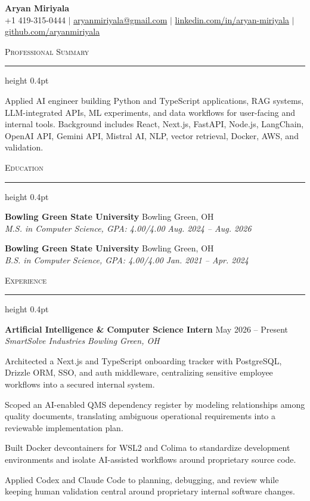 \documentclass[letterpaper,11pt]{article}
\newcommand{\resumesection}[1]{%
  \par\vspace{2pt}%
  {\large\scshape #1}\par\vspace{2pt}%
  \hrule height 0.4pt\vspace{2pt}%
}
\newcommand{\resumeSubheading}[4]{
  \textbf{#1} \hfill #2\\
  \textit{#3} \hfill \textit{#4}
}
\begin{document}
\begin{center}
  {\LARGE \textbf{Aryan Miriyala}}\\[-1pt]
  \small
  +1 419-315-0444 $|$
  \href{mailto:aryanmiriyala@gmail.com}{aryanmiriyala@gmail.com} $|$
  \href{https://www.linkedin.com/in/aryan-miriyala-7788a21b6/}{linkedin.com/in/aryan-miriyala} $|$
  \href{https://github.com/aryanmiriyala}{github.com/aryanmiriyala}
\end{center}\vspace{-10pt}

\resumesection{Professional Summary}
Applied AI engineer building Python and TypeScript applications, RAG systems, LLM-integrated APIs, ML experiments, and data workflows for user-facing and internal tools. Background includes React, Next.js, FastAPI, Node.js, LangChain, OpenAI API, Gemini API, Mistral AI, NLP, vector retrieval, Docker, AWS, and validation.

\resumesection{Education}
\resumeSubheading
{Bowling Green State University}{Bowling Green, OH}
{M.S. in Computer Science, GPA: 4.00/4.00}{Aug. 2024 -- Aug. 2026}

\resumeSubheading
{Bowling Green State University}{Bowling Green, OH}
{B.S. in Computer Science, GPA: 4.00/4.00}{Jan. 2021 -- Apr. 2024}

\resumesection{Experience}
\resumeSubheading
{Artificial Intelligence \& Computer Science Intern}{May 2026 -- Present}
{SmartSolve Industries}{Bowling Green, OH}
\begin{tightitemize}
\item Architected a Next.js and TypeScript onboarding tracker with PostgreSQL, Drizzle ORM, SSO, and auth middleware, centralizing sensitive employee workflows into a secured internal system.
  \item Scoped an AI-enabled QMS dependency register by modeling relationships among quality documents, translating ambiguous operational requirements into a reviewable implementation plan.
  \item Built Docker devcontainers for WSL2 and Colima to standardize development environments and isolate AI-assisted workflows around proprietary source code.
  \item Applied Codex and Claude Code to planning, debugging, and review while keeping human validation central around proprietary internal software changes.
\end{tightitemize}
\end{document}
